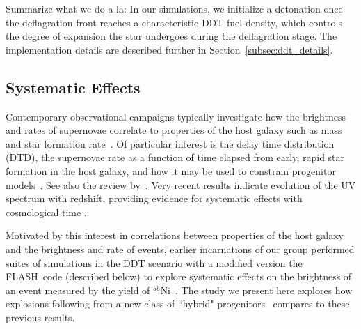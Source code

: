 \documentclass[iop,apj]{emulateapj}
\newcommand{\secref}[1]{Section~\ref{#1}}
\newcommand{\code}[1]{\textsc{#1}}
\newcommand{\FLASH}{\code{FLASH}}
\begin{document}
Summarize what we do a la:
In our simulations, we
initialize a detonation once the deflagration front reaches a
characteristic DDT fuel density, which controls the degree of
expansion the star undergoes during the deflagration stage. The
implementation details are described further in
\secref{subsec:ddt_details}.


\subsection{Systematic Effects}

Contemporary observational campaigns typically investigate how
the brightness and rates of supernovae correlate to 
properties of the host galaxy such as mass and star formation
rate~\citep[c.f.][]{graurmaoz2013,graurbiancomodjaz2015}. Of
particular interest is the delay time distribution (DTD), the
supernovae rate as a function of time elapsed from 
early, rapid
star formation in the host galaxy, and how it may be used
to constrain progenitor models~\citep{hachisu:2008,
conleyetal2011,howell2011,grauretal2011,biancoetal2011,maozmannuccibrandt2012}.
See also the review by~\citet{maozmannucci2012}.
Very recent results indicate evolution of the UV spectrum with 
redshift, providing evidence for systematic effects with
cosmological time \citep{milneandfoley2015}.

Motivated by this interest in correlations between properties of the
host galaxy and the brightness and rate of events, earlier incarnations of  
our group performed suites of simulations in the DDT scenario
with a modified version the \FLASH\ code (described below) to explore
systematic effects on the brightness of an event measured by the yield of
$^{56}$Ni~\citep{Krueger2010On-Variations-o,jacketal2010,kruegetal12}. The
study we present here explores how explosions following from a new class
of ``hybrid" 
progenitors~\citep{denissenkovetal2013,chenetal2014,denissenkovetal2015} 
compares to these previous results.
\end{document}
